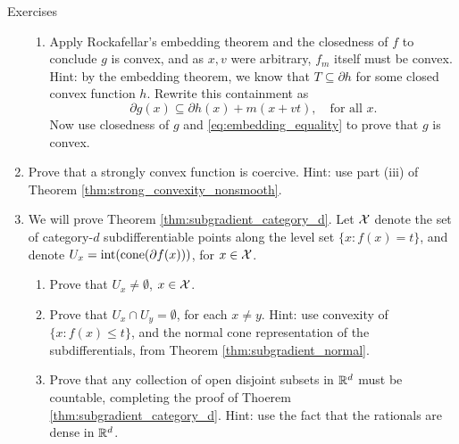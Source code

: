 \begin{xcb}{Exercises}
\begin{enumerate}[label=\thechapter.\arabic*]
\begin{enumerate}[label=\alph*.]
\item Apply Rockafellar's embedding theorem and the closedness of $f$ to
  conclude $g$ is convex, and as $x,v$ were arbitrary, $f_m$ itself must be
  convex. Hint: by the embedding theorem, we know that $T \subseteq \partial h$
  for some closed convex function $h$. Rewrite this containment as 
  \[
  \partial g(x) \subseteq \partial h(x) + m(x+vt), \quad \text{for all $x$}.
  \]
  Now use closedness of $g$ and \eqref{eq:embedding_equality} to prove that $g$
  is convex. 
\end{enumerate}

\item \label{ex:strong_convexity_coercive}
  Prove that a strongly convex function is coercive. Hint: use part (iii) of
  Theorem \ref{thm:strong_convexity_nonsmooth}.  




\item \label{ex:subgradient_category_d}
  We will prove Theorem \ref{thm:subgradient_category_d}. Let $\mathcal{X}$ denote the
  set of category-$d$ subdifferentiable points along the level set $\{x : f(x) =
  t\}$, and denote $U_x = \operatorname{int}(\operatorname{cone}(\partial f(x)))$, for $x \in \mathcal{X}$. 

\begin{enumerate}[label=\alph*.]
\item Prove that $U_x \not= \emptyset$, $x \in \mathcal{X}$.

\item Prove that $U_x \cap U_y = \emptyset$, for each $x \not= y$. Hint: use
  convexity of $\{x : f(x) \leq t\}$, and the normal cone representation of the 
  subdifferentials, from Theorem \ref{thm:subgradient_normal}.    

\item Prove that any collection of open disjoint subsets in $\mathbb{R}^d$ must be 
  countable, completing the proof of Thoerem
  \ref{thm:subgradient_category_d}. Hint: use the fact that the rationals are
  dense in $\mathbb{R}^d$.
\end{enumerate}

\end{enumerate}
\end{xcb}